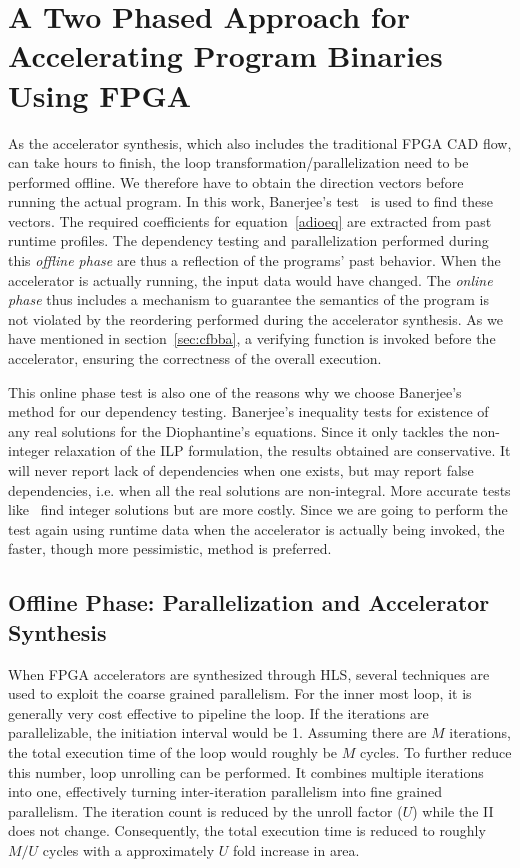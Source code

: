 \section{A Two Phased Approach for Accelerating Program Binaries Using FPGA}
\label{makingAcc}
As the accelerator synthesis, which also includes the traditional FPGA CAD flow,
can take hours to finish, the loop transformation/parallelization need to be performed offline. We therefore have to obtain the direction vectors 
before running the actual program. 
In this work, Banerjee's test~\cite{banerjee} is used to find these vectors. The required coefficients for equation~\ref{adioeq} are extracted from past runtime profiles. The dependency testing and parallelization performed during this \textit{offline phase} are  thus a reflection of the programs' past behavior. When the accelerator is actually running, the input data would have changed. The \textit{online phase} thus includes a mechanism to guarantee the 
semantics of the program is not violated by the reordering performed during
the accelerator synthesis. As we have mentioned in section~\ref{sec:cfbba},
a verifying function is invoked before the accelerator, ensuring the correctness
of the overall execution. 


This online phase test is also one of the reasons why we choose Banerjee's method for our dependency testing.
Banerjee's inequality tests for existence of any real solutions for the Diophantine's equations. Since it only tackles the non-integer relaxation of the ILP formulation, the results obtained are conservative.
It will never report lack of dependencies when one exists,  but may report false dependencies, i.e. when all the real solutions are non-integral.
 More accurate tests like~\cite{omega} find integer solutions but are more costly. Since we are
going to perform the test again using runtime data when the accelerator is actually
being invoked, the faster, though more pessimistic, method is preferred.



\subsection{Offline Phase: Parallelization and Accelerator Synthesis}



When FPGA accelerators are synthesized through HLS, several techniques are used to exploit
the coarse grained parallelism. For the inner most
loop, it is generally very cost effective to pipeline the loop. If
the iterations are parallelizable, the initiation interval would be 1.
Assuming there are $M$ iterations, the total execution time of the loop
would roughly be $M$ cycles. To further reduce this number, loop unrolling
can be performed. It combines multiple iterations into one, effectively
turning inter-iteration parallelism into fine grained parallelism. 
The iteration count is reduced by the unroll factor ($U$) while the II does not change. Consequently, the total execution time is reduced to roughly $M/U$ cycles with a approximately $U$ fold increase in area. 


